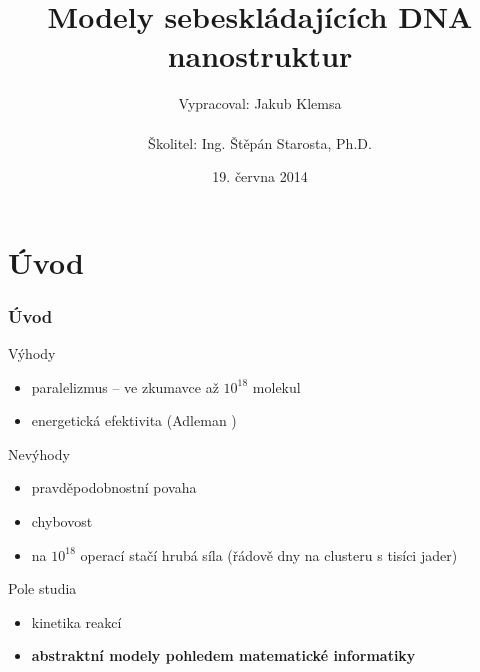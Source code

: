 \documentclass[10pt]{beamer}
\title{Modely sebeskládajících DNA nanostruktur}
\institute
{
	Fakulta jaderná a fyzikálně inženýrská\\
	Matematická informatika
}
\author{Vypracoval: Jakub Klemsa\\
	~\\
	Školitel: Ing. Štěpán Starosta, Ph.D.}
\date{19. června 2014}
\newcommand{\NP}{\mathsf{NP}}
\theoremstyle{definition}
\theoremstyle{remark}
\begin{document}
\begin{frame}
	\titlepage
\end{frame}

\begin{frame}
	\tableofcontents
\end{frame}


\section{Úvod}

\begin{frame}
\frametitle{Úvod}
	Výhody
	\begin{itemize}
		\item paralelizmus -- ve zkumavce až $10^{18}$  molekul
		\item energetická efektivita (Adleman \cite{adleman94})
	\end{itemize}
	\pause
	Nevýhody
	\begin{itemize}
		\item pravděpodobnostní povaha
		\item chybovost
		\item na $10^{18}$ operací stačí hrubá síla (řádově dny na clusteru s tisíci jader)
	\end{itemize}
	\pause
	Pole studia
	\begin{itemize}
		\item kinetika reakcí
		\item {\bf abstraktní modely pohledem matematické informatiky}
	\end{itemize}
\end{frame}
\end{document}
